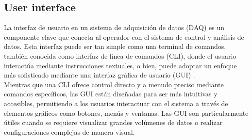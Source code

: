 \documentclass{report}
\begin{document}




\subsection{User interface}

\noindent La interfaz de usuario en un sistema de adquisición de datos (DAQ) es un componente clave que conecta al operador con el sistema de control y análisis de datos. Esta interfaz puede ser tan simple como una terminal de comandos, también conocida como interfaz de línea de comandos (CLI), donde el usuario interactúa mediante instrucciones textuales, o bien, puede adoptar un enfoque más sofisticado mediante una interfaz gráfica de usuario (GUI) \cite{webster1}.\\

\noindent Mientras que una CLI ofrece control directo y a menudo preciso mediante comandos específicos, las GUI están diseñadas para ser más intuitivas y accesibles, permitiendo a los usuarios interactuar con el sistema a través de elementos gráficos como botones, menús y ventanas. Las GUI son particularmente útiles cuando se requiere visualizar grandes volúmenes de datos o realizar configuraciones complejas de manera visual.\\
\end{document}
